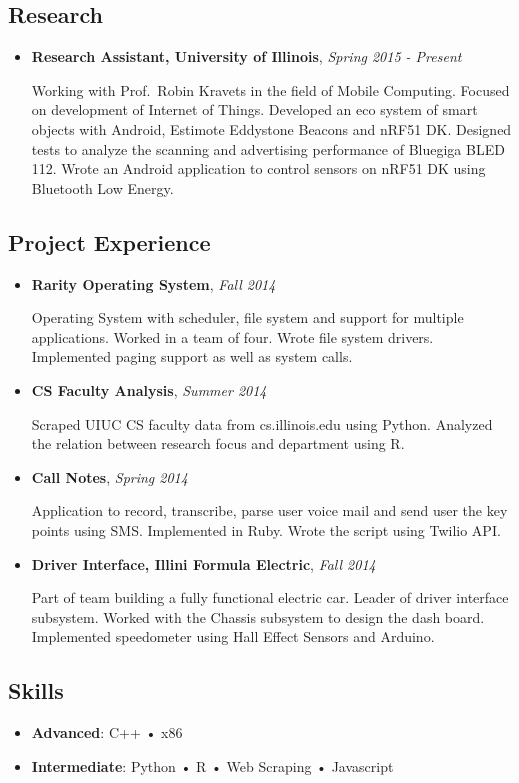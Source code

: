 \documentclass[]{article}
\begin{document}
\subsection{Research}

\begin{itemize}
\item
  \textbf{Research Assistant, University of Illinois}, \emph{Spring 2015
  - Present}

  Working with Prof.~Robin Kravets in the field of Mobile Computing.
  Focused on development of Internet of Things. Developed an eco system
  of smart objects with Android, Estimote Eddystone Beacons and nRF51
  DK. Designed tests to analyze the scanning and advertising performance
  of Bluegiga BLED 112. Wrote an Android application to control sensors
  on nRF51 DK using Bluetooth Low Energy.
\end{itemize}

\subsection{Project Experience}

\begin{itemize}
\item
  \textbf{Rarity Operating System}, \emph{Fall 2014}

  Operating System with scheduler, file system and support for multiple
  applications. Worked in a team of four. Wrote file system drivers.
  Implemented paging support as well as system calls.
\item
  \textbf{CS Faculty Analysis}, \emph{Summer 2014}

  Scraped UIUC CS faculty data from cs.illinois.edu using Python.
  Analyzed the relation between research focus and department using R.
\item
  \textbf{Call Notes}, \emph{Spring 2014}

  Application to record, transcribe, parse user voice mail and send user
  the key points using SMS. Implemented in Ruby. Wrote the script using
  Twilio API.
\item
  \textbf{Driver Interface, Illini Formula Electric}, \emph{Fall 2014}

  Part of team building a fully functional electric car. Leader of
  driver interface subsystem. Worked with the Chassis subsystem to
  design the dash board. Implemented speedometer using Hall Effect
  Sensors and Arduino.
\end{itemize}

\subsection{Skills}

\begin{itemize}
\item
  \textbf{Advanced}: C++ • x86
\item
  \textbf{Intermediate}: Python • R • Web Scraping • Javascript
\end{itemize}
\end{document}
